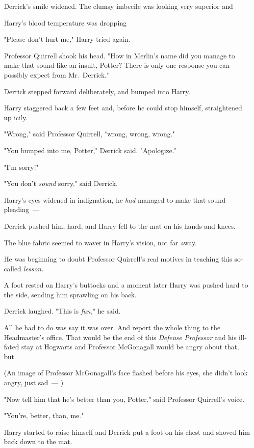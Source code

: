 Derrick's smile widened. The clumsy imbecile was looking very superior
and{\el}

{\el} Harry's blood temperature was dropping{\el}

"Please don't hurt me," Harry tried again.

Professor Quirrell shook his head. "How in Merlin's name did you manage to make
that sound like an insult, Potter? There is only one response you can possibly
expect from Mr.~Derrick."

Derrick stepped forward deliberately, and bumped into Harry.

Harry staggered back a few feet and, before he could stop himself, straightened
up icily.

"Wrong," said Professor Quirrell, "wrong, wrong, wrong."

"You bumped into me, Potter," Derrick said. "Apologize."

"I'm sorry!"

"You don't \emph{sound} sorry," said Derrick.

Harry's eyes widened in indignation, he \emph{had} managed to make that sound
pleading~---

Derrick pushed him, hard, and Harry fell to the mat on his hands and knees.

The blue fabric seemed to waver in Harry's vision, not far away.

He was beginning to doubt Professor Quirrell's real motives in teaching this
so-called \emph{lesson.}

A foot rested on Harry's buttocks and a moment later Harry was pushed hard to
the side, sending him sprawling on his back.

Derrick laughed. "This is \emph{fun,}" he said.

All he had to do was say it was over. And report the whole thing to the
Headmaster's office. That would be the end of this \emph{Defense Professor} and
his ill-fated stay at Hogwarts and{\el} Professor McGonagall would be angry
about that, but{\el}

(An image of Professor McGonagall's face flashed before his eyes, she didn't
look angry, just sad~--- )

"Now tell him that he's better than you, Potter," said Professor Quirrell's
voice.

"You're, better, than, me."

Harry started to raise himself and Derrick put a foot on his chest and shoved
him back down to the mat.

